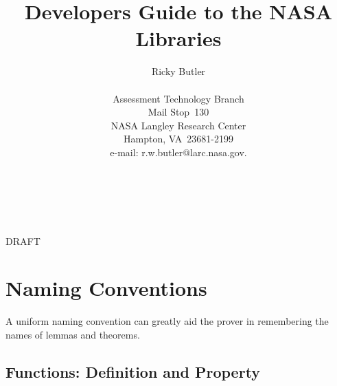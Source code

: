 \documentclass[12pt]{article}
\begin{document}
\title{Developers Guide to the NASA Libraries}

\author{Ricky Butler \\ ~\\
Assessment Technology Branch \\
Mail Stop~130 \\
NASA Langley Research Center \\
Hampton, VA~23681-2199 \\
e-mail: r.w.butler@larc.nasa.gov. 
}

\maketitle





{\huge \sf ~\\~\\  \begin{center}

DRAFT

\end{center}
}

\newpage



\section{Naming Conventions}

A uniform naming convention can greatly aid the prover in remembering the
names of lemmas and theorems.



\subsection{Functions: Definition and Property}
\end{document}
